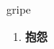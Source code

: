
\begin{frame}
{\huge gripe}
\begin{center}
\begin{enumerate}\Large
  \item \textbf{抱怨}
\end{enumerate}
\end{center}
\end{frame}
